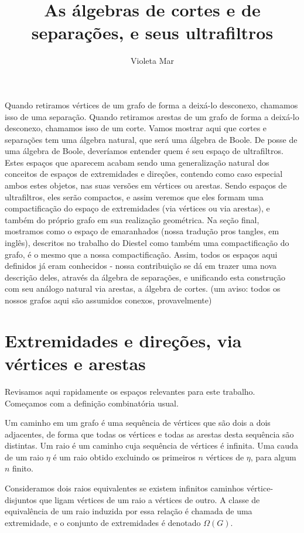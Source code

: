 \documentclass[11pt]{article}
\title{As álgebras de cortes e de separações, e seus ultrafiltros}
\author{Violeta Mar}
\date{}
\renewcommand{\textit}[1]{{\fakeitalic#1}}
\newcommand{\pulinho}{\vspace{.5cm}}
\theoremstyle{definition}
\theoremstyle{definition}
\theoremstyle{definition}
\theoremstyle{definition}
\theoremstyle{definition}
\theoremstyle{definition}
\theoremstyle{definition}
\theoremstyle{definition}
\newtheorem*{definition*}{Definição}
\newenvironment{definicao*}{
\definecolor{shadecolor}{HTML}{defcfc}
\begin{shaded}
\begin{definition*}
}
{
\end{definition*}
\end{shaded}
}
\theoremstyle{definition}
\theoremstyle{definition}
\theoremstyle{definition}
\theoremstyle{definition}
\begin{document}
\maketitle

Quando retiramos vértices de um grafo de forma a deixá-lo desconexo, chamamos isso de uma separação. Quando retiramos arestas de um grafo de forma a deixá-lo desconexo, chamamos isso de um corte. Vamos mostrar aqui que cortes e separações tem uma álgebra natural, que será uma álgebra de Boole. De posse de uma álgebra de Boole, deveríamos entender quem é seu espaço de ultrafiltros. Estes espaços que aparecem acabam sendo uma generalização natural dos conceitos de espaços de extremidades e direções, contendo como caso especial ambos estes objetos, nas suas versões em vértices ou arestas. Sendo espaços de ultrafiltros, eles serão compactos, e assim veremos que eles formam uma compactificação do espaço de extremidades (via vértices ou via arestas), e também do próprio grafo em sua realização geométrica. Na seção final, mostramos como o espaço de emaranhados (nossa tradução pros \textit{tangles}, em inglês), descritos no trabalho do Diestel \cite{Diestel2017} como também uma compactificação do grafo, é o mesmo que a nossa compactificação. Assim, todos os espaços aqui definidos já eram conhecidos - nossa contribuição se dá em trazer uma nova descrição deles, através da álgebra de separações, e unificando esta construção com seu análogo natural via arestas, a álgebra de cortes.  (um aviso: todos os nossos grafos aqui são assumidos conexos, provavelmente)

\section{Extremidades e direções, via vértices e arestas}
Revisamos aqui rapidamente os espaços relevantes para este trabalho. Começamos com a definição combinatória usual.

\begin{definicao*}
    Um \textit{caminho} em um grafo é uma sequência de vértices que são dois a dois adjacentes, de forma que todas os vértices e todas as arestas desta sequência são distintas. Um \textit{raio} é um caminho cuja sequência de vértices é infinita. Uma \textit{cauda} de um raio $\eta$ é um raio obtido excluindo os primeiros $n$ vértices de $\eta$, para algum $n$ finito.

    \pulinho

    Consideramos dois raios \textit{equivalentes} se existem infinitos caminhos vértice-disjuntos que ligam vértices de um raio a vértices de outro. A classe de equivalência de um raio induzida por essa relação é chamada de uma \textit{extremidade}, e o conjunto de extremidades é denotado $\Omega(G)$. 
\end{definicao*}
\end{document}
